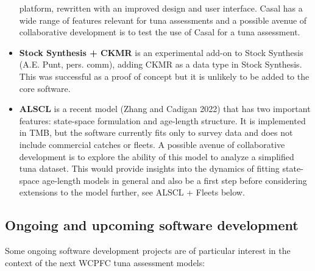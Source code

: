 \documentclass{SCreport}
\begin{document}
\begin{itemize}
  platform, rewritten with an improved design and user interface. Casal has a
  wide range of features relevant for tuna assessments and a possible avenue of
  collaborative development is to test the use of Casal for a tuna assessment.
  \newpage
  \item \textbf{Stock Synthesis + CKMR} is an experimental add-on to Stock
  Synthesis (A.E. Punt, pers. comm), adding CKMR as a data type in Stock
  Synthesis. This was successful as a proof of concept but it is unlikely to be
  added to the core software.
  \item \textbf{ALSCL} is a recent model (Zhang and Cadigan 2022) that has two
  important features: state-space formulation and age-length structure. It is
  implemented in TMB, but the software currently fits only to survey data and
  does not include commercial catches or fleets. A possible avenue of
  collaborative development is to explore the ability of this model to analyze a
  simplified tuna dataset. This would provide insights into the dynamics of
  fitting state-space age-length models in general and also be a first step
  before considering extensions to the model further, see ALSCL + Fleets below.
\end{itemize}

\subsection{Ongoing and upcoming software development}
\label{sec:ongoing-upcoming-development}

Some ongoing software development projects are of particular interest in the
context of the next WCPFC tuna assessment models:
\end{document}

